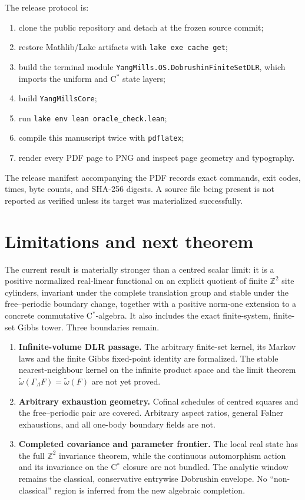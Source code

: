 \documentclass[11pt]{article}
\theoremstyle{definition}
\newcommand{\Z}{\mathbb Z}
\begin{document}
The release protocol is:
\begin{enumerate}
\item clone the public repository and detach at the frozen source commit;
\item restore Mathlib/Lake artifacts with \texttt{lake exe cache get};
\item build the terminal module
  \texttt{YangMills.OS.DobrushinFiniteSetDLR}, which imports the uniform and
  C$^*$ state layers;
\item build \texttt{YangMillsCore};
\item run \texttt{lake env lean oracle\_check.lean};
\item compile this manuscript twice with \texttt{pdflatex};
\item render every PDF page to PNG and inspect page geometry and typography.
\end{enumerate}
The release manifest accompanying the PDF records exact commands, exit codes,
times, byte counts, and SHA-256 digests.  A source file being present is not
reported as verified unless its target was materialized successfully.

\section{Limitations and next theorem}

The current result is materially stronger than a centred scalar limit: it is
a positive normalized real-linear functional on an explicit quotient of
finite $\Z^2$ site cylinders, invariant under the complete translation group
and stable under the free--periodic boundary change, together with a positive
norm-one extension to a concrete commutative C$^*$-algebra.  It also includes
the exact finite-system, finite-set Gibbs tower.  Three boundaries remain.

\begin{enumerate}
\item \textbf{Infinite-volume DLR passage.}  The arbitrary finite-set kernel,
  its Markov laws and the finite Gibbs fixed-point identity are formalized.
  The stable nearest-neighbour kernel on the infinite product space and the
  limit theorem $\widetilde\omega(\Gamma_\Lambda F)=\widetilde\omega(F)$ are
  not yet proved.
\item \textbf{Arbitrary exhaustion geometry.}  Cofinal schedules of centred
  squares and the free--periodic pair are covered.  Arbitrary aspect ratios,
  general F\o lner exhaustions, and all one-body boundary fields are not.
\item \textbf{Completed covariance and parameter frontier.}  The local real
  state has the full $\Z^2$ invariance theorem, while the continuous
  automorphism action and its invariance on the C$^*$ closure are not bundled.
  The analytic window remains the classical, conservative entrywise
  Dobrushin envelope.  No ``non-classical'' region is inferred from the new
  algebraic completion.
\end{enumerate}
\end{document}
